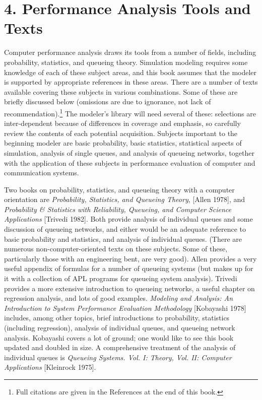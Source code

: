 \section*{4. Performance Analysis Tools and Texts}

Computer performance analysis draws its tools from a number of fields,
including probability, statistics, and queueing theory. Simulation modeling
requires some knowledge of each of these subject areas, and this book assumes
that the modeler is supported by appropriate references in these areas. There
are a number of texts available covering these subjects in various
combinations. Some of these are briefly discussed below (omissions are due to
ignorance, not lack of recommendation).\footnote{Full citations are given in the
References at the end of this book.} The modeler's library will need several of
these: selections are inter-dependent because of differences in coverage and
emphasis, so carefully review the contents of each potential acquisition.
Subjects important to the beginning modeler are basic probability, basic
statistics, statistical aspects of simulation, analysis of single queues, and
analysis of queueing networks, together with the application of these subjects
in performance evaluation of computer and communication systems.

Two books on probability, statistics, and queueing theory with a computer
orientation are \textit{Probability, Statistics, and Queueing Theory}, [Allen 1978],
and \textit{Probability \& Statistics with Reliability, Queueing, and Computer Science
Applications} [Trivedi 1982]. Both provide analysis of individual queues and
some discussion of queueing networks, and either would be an adequate reference
to basic probability and statistics, and analysis of individual queues. (There
are numerous non-computer-oriented texts on these subjects. Some of these,
particularly those with an engineering bent, are very good). Allen provides a
very useful appendix of formulas for a number of queueing systems (but makes
up for it with a collection of APL programs for queueing system analysis).
Trivedi provides a more extensive introduction to queueing networks, a useful
chapter on regression analysis, and lots of good examples. \textit{Modeling and
Analysis: An Introduction to System Performance Evaluation Methodology}
[Kobayashi 1978] includes, among other topics, brief introductions to
probability, statistics (including regression), analysis of individual queues,
and queueing network analysis. Kobayashi covers a lot of ground; one would
like to see this book updated and doubled in size. A comprehensive treatment
of the analysis of individual queues is \textit{Queueing Systems. Vol. I: Theory,
Vol. II: Computer Applications} [Kleinrock 1975].

